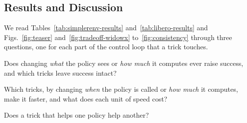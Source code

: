 
\subsection{Results and Discussion}

We read Tables~\ref{tab:simplerenv-results} and~\ref{tab:libero-results}
and Figs.~\ref{fig:teaser} and~\ref{fig:tradeoff-widowx}
to~\ref{fig:consistency} through three questions, one for each part of the
control loop that a trick touches.
\begin{list}{}{\setlength{\labelwidth}{2.9em}\setlength{\labelsep}{0.4em}%
  \setlength{\leftmargin}{3.3em}\setlength{\itemsep}{0pt}%
  \setlength{\parsep}{0pt}\setlength{\topsep}{2pt}}
\item[\textbf{RQ-1:}] Does changing \emph{what} the policy sees or
\emph{how much} it computes ever raise success, and which tricks leave
success intact?
\item[\textbf{RQ-2:}] Which tricks, by changing \emph{when} the policy is
called or \emph{how much} it computes, make it faster, and what does each
unit of speed cost?
\item[\textbf{RQ-3:}] Does a trick that helps one policy help another?
\end{list}

